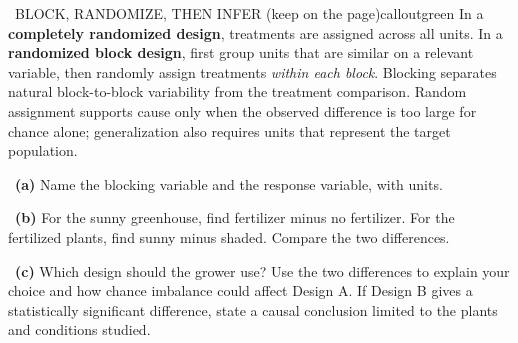 \documentclass[11pt]{article}
\begin{document}
\begin{callout}{\IconBook\ BLOCK, RANDOMIZE, THEN INFER (keep on the page)}{calloutgreen}
In a \textbf{completely randomized design}, treatments are assigned across all units. In a
\textbf{randomized block design}, first group units that are similar on a relevant variable, then randomly
assign treatments \emph{within each block}. Blocking separates natural block-to-block variability from the
treatment comparison. Random assignment supports cause only when the observed difference is too large for
chance alone; generalization also requires units that represent the target population.
\end{callout}

~\textbf{(a)} Name the blocking variable and the response variable, with units.\par
{}

~\textbf{(b)} For the sunny greenhouse, find fertilizer minus no fertilizer. For the fertilized plants, find sunny minus shaded. Compare the two differences.\par
{}

~\textbf{(c)} Which design should the grower use? Use the two differences to explain your choice and how chance imbalance could affect Design A. If Design B gives a statistically significant difference, state a causal conclusion limited to the plants and conditions studied.\par
{}
\end{document}
